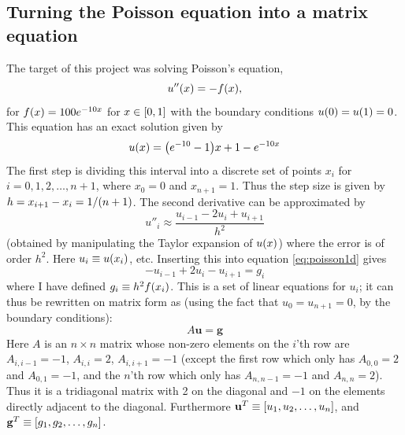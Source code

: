 \documentclass[a4paper,english]{article}
\renewcommand\vec{\mathbf}
\let\originalleft\left
\let\originalright\right
\renewcommand{\left}{\mathopen{}\mathclose\bgroup\originalleft}
\renewcommand{\right}{\aftergroup\egroup\originalright}
\begin{document}
\subsection{Turning the Poisson equation into a matrix equation}
The target of this project was solving Poisson's equation,
\begin{equation}
  u''\left(x\right) = -f\left(x\right)\text{,}
  \label{eq:poisson1d}
\end{equation}
for $f\left(x\right) = 100e^{-10x}$ for $x\in \left[0,1\right]$ with the boundary conditions $u\left(0\right) = u\left(1\right) = 0$. This equation has an exact solution given by \cite{assignment}
\begin{equation}
  u\left(x\right) = \left(e^{-10}-1\right)x+1-e^{-10x}
  \label{eq:u_exact}
\end{equation}
The first step is dividing this interval into a discrete set of points $x_i$ for $i = 0,1,2,\dots,n+1$, where $x_0 = 0$ and $x_{n+1} = 1$. Thus the step size is given by $h = x_{i+1}-x_i = 1/\left(n+1\right)$. The second derivative can be approximated by \cite{lecturenotes}
\begin{equation}
  u''_i \approx \frac{u_{i-1}-2u_i+u_{i+1}}{h^2}
  \label{eq:2ndderivative}
\end{equation}
(obtained by manipulating the Taylor expansion of $u\left(x\right)$) where the error is of order $h^2$. Here $u_i \equiv u\left(x_i\right)$, etc. Inserting this into equation \ref{eq:poisson1d} gives
\begin{equation*}
  -u_{i-1}+2u_i-u_{i+1} = g_i
\end{equation*}
where I have defined $g_i \equiv h^2f\left(x_i\right)$. This is a set of linear equations for $u_i$; it can thus be rewritten on matrix form as (using the fact that $u_0 = u_{n+1} = 0$, by the boundary conditions):
\begin{equation}
  A \vec{u} = \vec{g}
  \label{eq:matrix_eq}
\end{equation}
Here $A$ is an $n\times n$ matrix whose non-zero elements on the $i$'th row are $A_{i,i-1} = -1$, $A_{i,i} =2$, $A_{i,i+1} = -1$ (except the first row which only has $A_{0,0} = 2$ and $A_{0,1} = -1$, and the $n$'th row which only has $A_{n,n-1} = -1$ and $A_{n,n} = 2$). Thus it is a tridiagonal matrix with 2 on the diagonal and $-1$ on the elements directly adjacent to the diagonal. Furthermore $\vec{u}^T \equiv \left[u_1,u_2,\dots,u_n\right]$, and $\vec{g}^T \equiv \left[g_1,g_2,\dots,g_n\right]$.
\end{document}
